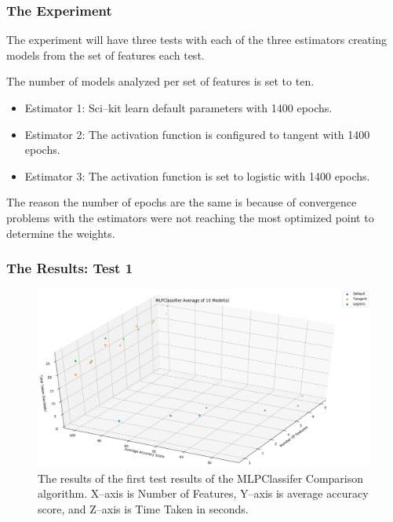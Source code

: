 \documentclass{beamer}
\begin{document}
\begin{frame}
\frametitle{The Experiment}

The experiment will have three tests with each of the three estimators creating models from the set of features each test. 
\newline

The number of models analyzed per set of features is set to ten.

\begin{itemize}
\item Estimator 1: Sci--kit learn default parameters with 1400 epochs.
\item Estimator 2: The activation function is configured to tangent with 1400 epochs.
\item Estimator 3: The activation function is set to logistic with 1400 epochs.
\end{itemize}
The reason the number of epochs are the same is because of convergence problems with the estimators were not reaching the most optimized point to determine the weights.

\end{frame}



\begin{frame}
\frametitle{The Results: Test 1}
\begin{figure}
\centering
\includegraphics[scale=0.335]{Test_1}
\caption{\scriptsize The results of the first test results of the MLPClassifer Comparison algorithm. X--axis is Number of Features, Y--axis is average accuracy score, and Z--axis is Time Taken in seconds.}
\end{figure}
\end{frame}
\end{document}
